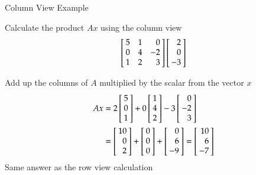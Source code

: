 \documentclass[10pt]{beamer}
\begin{document}
\begin{frame}{Column View Example}
\begin{example}
Calculate the product $Ax$ using the column view
\begin{equation*}
    \left[\negthickspace
          \begin{array}{rrrr}  5 &  1  &  0    \\
                               0 &  4  & -2    \\
                               1 &  2  &  3    \end{array}\negthickspace\right]
    \left[\negthickspace
          \begin{array}{r}  2 \\  0  \\  -3   \end{array}\negthickspace\right]
\end{equation*}
\end{example}
Add up the columns of $A$ multiplied by the scalar from the vector $x$
\begin{align*}
    Ax&= 2\left[\negthickspace\begin{array}{r}  5 \\ 0 \\  1 \end{array}\negthickspace\right]
    + 0\left[\negthickspace\begin{array}{r}  1 \\  4 \\  2 \end{array}\negthickspace\right]
    - 3\left[\negthickspace\begin{array}{r}  0 \\ -2 \\  3 \end{array}\negthickspace\right]\\
    &= \left[\negthickspace\begin{array}{r}  10 \\ 0 \\  2 \end{array}\negthickspace\right]
    + \left[\negthickspace\begin{array}{r}  0 \\  0 \\  0 \end{array}\negthickspace\right]
    +\left[\negthickspace\begin{array}{r}  0 \\ 6 \\  -9 \end{array}\negthickspace\right]
    =
    \left[\negthickspace
          \begin{array}{r}  10 \\  6  \\ -7 \end{array}\negthickspace\right]
\end{align*}
Same answer as the row view calculation
\end{frame}
\end{document}
